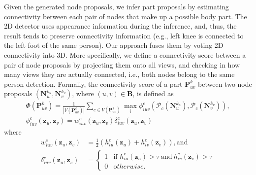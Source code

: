 Given the generated node proposals, we infer part proposals by estimating connectivity between each pair of nodes that make up a possible body part. The 2D detector \cite{Wei2016} uses appearance information during the inference, and, thus, the result tends to preserve connectivity information (e.g., left knee is connected to the left foot of the same person). Our approach fuses them by voting 2D connectivity into 3D. More specifically, we define a connectivity score between a pair of node proposals by projecting them onto all views, and checking in how many views they are actually connected, i.e., both nodes belong to the same person detection. Formally, the connectivity score of a part $\mathbf{P}_{uv}^k$ between two node proposals $( \mathbf{N}_{u}^{k_u}, \mathbf{N}_{v}^{k_v})$, where $(u,v) \in \mathbf{B}$, is defined as
\begin{gather}
{\Phi}( \mathbf{P}_{uv}^k )=  \frac{1}{ | V( \mathbf{P}_{uv}^k ) | } \sum_{c \in V(\mathbf{P}_{uv}^k)}   \max_{i} \phi_{iuv}^c \left( \mathcal{P}_c(\mathbf{N}^{k_u}_{u}),\mathcal{P}_c(\mathbf{N}^{k_v}_{v}) \right), \nonumber \\
\phi_{iuv}^c(\mathbf{z}_u,\mathbf{z}_v) = w_{iuv}^c(\mathbf{z}_u,\mathbf{z}_v)\delta^c_{iuv} \left(\mathbf{z}_u,\mathbf{z}_v \right) \nonumber
% 
%  
\end{gather}
where
\begin{align}
w_{iuv}^c(\mathbf{z}_u,\mathbf{z}_v) &= \frac{1}{2}\left(h_{iu}^c(\mathbf{z}_u) + h_{iv}^c(\mathbf{z}_v) \right), \text{and} \nonumber\\
\delta^c_{iuv}( \mathbf{z}_u ,\mathbf{z}_v) &=  \begin{cases}
1 & \mathrm{if}\,\, h_{iu}^c( \mathbf{z}_u ) > \tau ~\mathrm{and}~h_{iv}^c( \mathbf{z}_v ) > \tau\\
0 & {\mathrm otherwise}.
\end{cases} \nonumber
\end{align}
